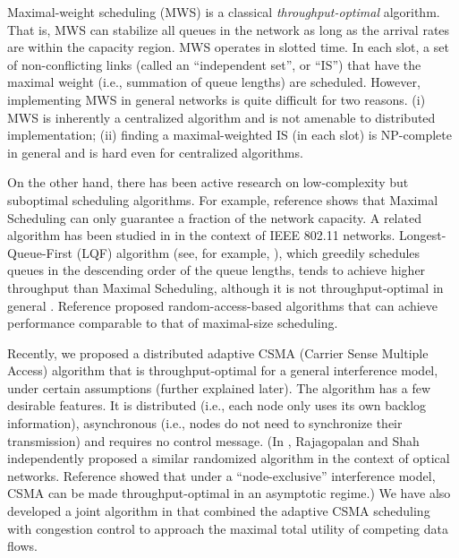 \documentclass{IEEEtran}
\begin{document}
Maximal-weight scheduling (MWS) \cite{TE92} is a classical \emph{throughput-optimal}
algorithm. That is, MWS can stabilize all queues in the network as
long as the arrival rates are within the capacity region. MWS operates
in slotted time. In each slot, a set of non-conflicting links (called
an {}``independent set'', or {}``IS'') that have the maximal weight
(i.e., summation of queue lengths) are scheduled. However, implementing
MWS in general networks is quite difficult for two reasons. (i) MWS
is inherently a centralized algorithm and is not amenable to distributed
implementation; (ii) finding a maximal-weighted IS (in each slot)
is NP-complete in general and is hard even for centralized algorithms. 

On the other hand, there has been active research on low-complexity
but suboptimal scheduling algorithms. For example, reference \cite{Maximal-Scheduling}
shows that Maximal Scheduling can only guarantee a fraction of the
network capacity. A related algorithm has been studied in \cite{bound-greedy}
in the context of IEEE 802.11 networks. Longest-Queue-First (LQF)
algorithm (see, for example, \cite{Dimakis,GMS,multi-hop-LoP,LQF-small}),
which greedily schedules queues in the descending order of the queue
lengths, tends to achieve higher throughput than Maximal Scheduling,
although it is not throughput-optimal in general \cite{GMS}. Reference
\cite{no-message-passing} proposed random-access-based algorithms
that can achieve performance comparable to that of maximal-size scheduling. 

Recently, we proposed a distributed adaptive CSMA (Carrier Sense Multiple
Access) algorithm \cite{Allerton} that is throughput-optimal for
a general interference model, under certain assumptions (further explained
later). The algorithm has a few desirable features. It is distributed
(i.e., each node only uses its own backlog information), asynchronous
(i.e., nodes do not need to synchronize their transmission) and requires
no control message. (In \cite{CISS-shah}, Rajagopalan and Shah independently
proposed a similar randomized algorithm in the context of optical
networks. Reference \cite{CSMA_marbach} showed that under a {}``node-exclusive''
interference model, CSMA can be made throughput-optimal in an asymptotic
regime.) We have also developed a joint algorithm in \cite{Allerton}
that combined the adaptive CSMA scheduling with congestion control
to approach the maximal total utility of competing data flows. \begin{comment}
In \cite{conv}, the optimality of these algorithms is proved formally.
\end{comment}
{}
\end{document}
